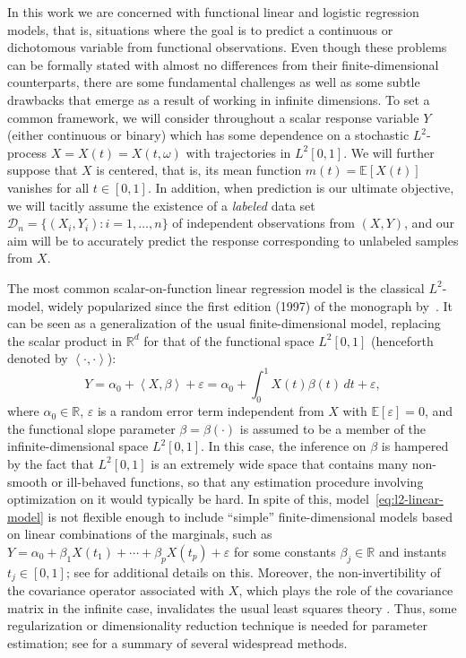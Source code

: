 \documentclass{article}
\numberwithin{equation}{section}
\theoremstyle{plain}
\renewcommand{\epsilon}{\varepsilon}
\newcommand{\R}{\mathbb{R}}
\newcommand{\E}{\mathbb{E}}
\newcommand\dotprod[2]{\left\langle#1,#2\right\rangle}
\begin{document}
In this work we are concerned with functional linear and logistic regression models, that is, situations where the goal is to predict a continuous or dichotomous variable from functional observations. Even though these problems can be formally stated with almost no differences from their finite-dimensional counterparts, there are some fundamental challenges as well as some subtle drawbacks that emerge as a result of working in infinite dimensions. To set a common framework, we will consider throughout a scalar response variable \(Y\) (either continuous or binary) which has some dependence on a stochastic \(L^2\)-process \(X=X(t)=X(t, \omega)\) with trajectories in \(L^2[0, 1]\). We will further suppose that \(X\) is centered, that is, its mean function \(m(t)=\E[X(t)]\) vanishes for all \(t\in[0,1]\). In addition, when prediction is our ultimate objective, we will tacitly assume the existence of a \textit{labeled} data set \(\mathcal D_n =\{(X_i, Y_i): i=1,\dots, n\}\) of independent observations from \((X, Y)\), and our aim will be to accurately predict the response corresponding to unlabeled samples from \(X\).

The most common scalar-on-function linear regression model is the classical \(L^2\)-model, widely popularized since the first edition (1997) of the monograph by~\citet{ramsay2005functional}. It can be seen as a generalization of the usual finite-dimensional model, replacing the scalar product in \(\R^d\) for that of the functional space \(L^2[0,1]\) (henceforth denoted by \(\dotprod{\cdot}{\cdot}\)):
\begin{equation}\label{eq:l2-linear-model}
  Y = \alpha_0 + \dotprod{X}{\beta} + \epsilon = \alpha_0 + \int_0^1 X(t)\beta(t)\, dt + \epsilon,
\end{equation}
where \(\alpha_0\in \R\), \(\epsilon\) is a random error term independent from \(X\) with \(\E [\epsilon]=0\), and the functional slope parameter \(\beta=\beta(\cdot)\) is assumed to be a member of the infinite-dimensional space \(L^2[0, 1]\). In this case, the inference on \(\beta\) is hampered by the fact that \(L^2[0,1]\) is an extremely wide space that contains many non-smooth or ill-behaved functions, so that any estimation procedure involving optimization on it would typically be hard. In spite of this, model~\eqref{eq:l2-linear-model} is not flexible enough to include ``simple'' finite-dimensional models based on linear combinations of the marginals, such as \(Y=\alpha_0 + \beta_1 X(t_1)+ \cdots + \beta_p X(t_p) + \epsilon\) for some constants \(\beta_j\in\R\) and instants \(t_j\in[0,1]\); see \citet{berrendero2020general} for additional details on this. Moreover, the non-invertibility of the covariance operator associated with \(X\), which plays the role of the covariance matrix in the infinite case, invalidates the usual least squares theory \citep[see e.g.][]{cardot2011functional}. Thus, some regularization or dimensionality reduction technique is needed for parameter estimation; see \citet{reiss2017methods} for a summary of several widespread methods.
\end{document}
